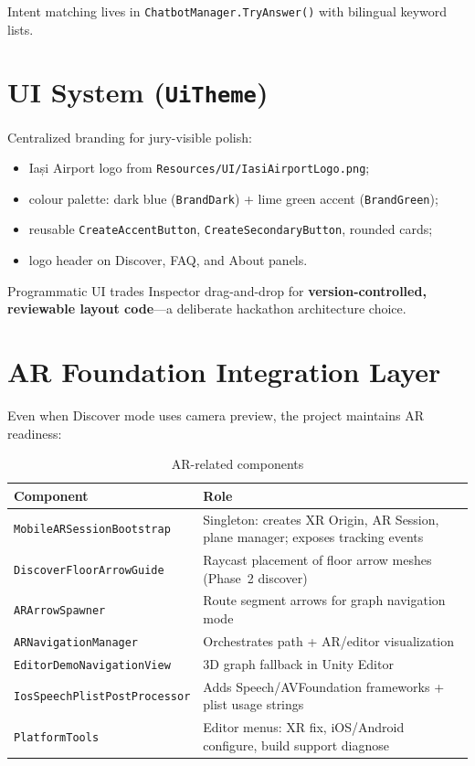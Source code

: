 \documentclass[11pt,a4paper]{article}
\begin{document}
Intent matching lives in \texttt{ChatbotManager.TryAnswer()} with bilingual keyword lists.

\section{UI System (\texttt{UiTheme})}

Centralized branding for jury-visible polish:

\begin{itemize}
    \item Iași Airport logo from \texttt{Resources/UI/IasiAirportLogo.png};
    \item colour palette: dark blue (\texttt{BrandDark}) + lime green accent (\texttt{BrandGreen});
    \item reusable \texttt{CreateAccentButton}, \texttt{CreateSecondaryButton}, rounded cards;
    \item logo header on Discover, FAQ, and About panels.
\end{itemize}

Programmatic UI trades Inspector drag-and-drop for \textbf{version-controlled, reviewable layout code}---a deliberate hackathon architecture choice.

\section{AR Foundation Integration Layer}

Even when Discover mode uses camera preview, the project maintains AR readiness:

\begin{table}[H]
\centering
\caption{AR-related components}
\begin{tabular}{@{}p{4.5cm}p{9.5cm}@{}}
\toprule
\textbf{Component} & \textbf{Role} \\
\midrule
\texttt{MobileARSessionBootstrap} & Singleton: creates XR Origin, AR Session, plane manager; exposes tracking events \\
\texttt{DiscoverFloorArrowGuide} & Raycast placement of floor arrow meshes (Phase~2 discover) \\
\texttt{ARArrowSpawner} & Route segment arrows for graph navigation mode \\
\texttt{ARNavigationManager} & Orchestrates path + AR/editor visualization \\
\texttt{EditorDemoNavigationView} & 3D graph fallback in Unity Editor \\
\texttt{IosSpeechPlistPostProcessor} & Adds Speech/AVFoundation frameworks + plist usage strings \\
\texttt{PlatformTools} & Editor menus: XR fix, iOS/Android configure, build support diagnose \\
\bottomrule
\end{tabular}
\end{table}
\end{document}

